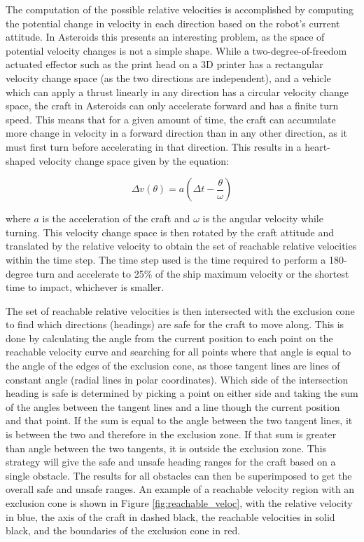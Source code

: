 \documentclass[10pt,final,conference]{article}
\begin{document}
The computation of the possible relative velocities is accomplished by computing the potential change in velocity in each direction based on the robot's current attitude. In Asteroids this presents an interesting problem, as the space of potential velocity changes is not a simple shape. While a two-degree-of-freedom actuated effector such as the print head on a 3D printer has a rectangular velocity change space (as the two directions are independent), and a vehicle which can apply a thrust linearly in any direction has a circular velocity change space, the craft in Asteroids can only accelerate forward and has a finite turn speed. This means that for a given amount of time, the craft can accumulate more change in velocity in a forward direction than in any other direction, as it must first turn before accelerating in that direction. This results in a heart-shaped velocity change space given by the equation:

\begin{equation*}
\Delta v(\theta) = a \left( \Delta t - \frac{\theta}{\omega} \right)
\end{equation*}

where $a$ is the acceleration of the craft and $\omega$ is the angular velocity while turning. This velocity change space is then rotated by the craft attitude and translated by the relative velocity to obtain the set of reachable relative velocities within the time step. The time step used is the time required to perform a 180-degree turn and accelerate to 25\% of the ship maximum velocity or the shortest time to impact, whichever is smaller. 

The set of reachable relative velocities is then intersected with the exclusion cone to find which directions (headings) are safe for the craft to move along. This is done by calculating the angle from the current position to each point on the reachable velocity curve and searching for all points where that angle is equal to the angle of the edges of the exclusion cone, as those tangent lines are lines of constant angle (radial lines in polar coordinates). Which side of the intersection heading is safe is determined by picking a point on either side and taking the sum of the angles between the tangent lines and a line though the current position and that point. If the sum is equal to the angle between the two tangent lines, it is between the two and therefore in the exclusion zone. If that sum is greater than angle between the two tangents, it is outside the exclusion zone. This strategy will give the safe and unsafe heading ranges for the craft based on a single obstacle. The results for all obstacles can then be superimposed to get the overall safe and unsafe ranges. An example of a reachable velocity region with an exclusion cone is shown in Figure \ref{fig:reachable_veloc}, with the relative velocity in blue, the axis of the craft in dashed black, the reachable velocities in solid black, and the boundaries of the exclusion cone in red.
\end{document}
